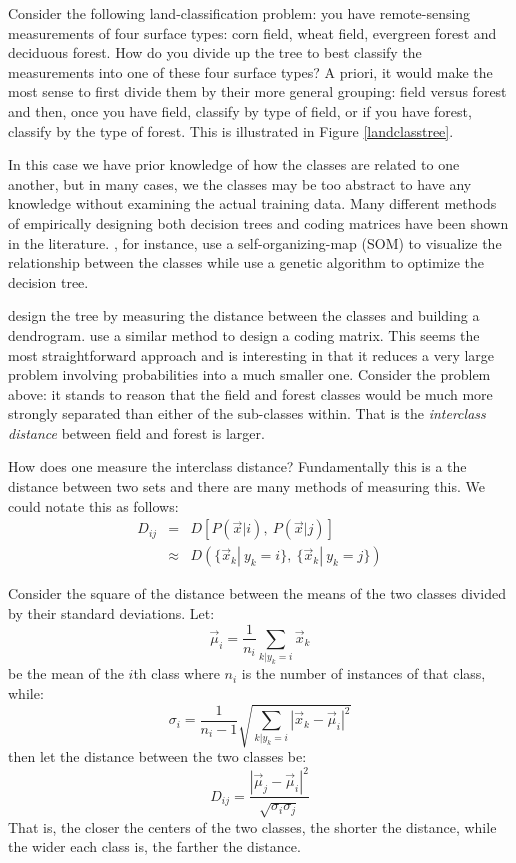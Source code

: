 \documentclass{article}
\begin{document}
Consider the following land-classification problem: you have remote-sensing measurements of four surface types: corn field, wheat field, evergreen forest and deciduous forest.
How do you divide up the tree to best classify the measurements into one of these four surface types?
A priori, it would make the most sense to first divide them by their more general grouping: field versus forest and then, once you have field, classify by type of field, or if you have forest, classify by the type of forest.
This is illustrated in Figure \ref{landclasstree}.

In this case we have prior knowledge of how the classes are related to one another,
but in many cases, we the classes may be too abstract to have any knowledge without examining the actual training data.
Many different methods of empirically designing both decision trees and coding matrices have been shown in the literature.
\citet{Cheong_etal2004}, for instance, use a self-organizing-map (SOM)
\cite{Kohonen2000} to visualize the relationship between the classes while
\citet{Lee_Oh2003} use a genetic algorithm to optimize the decision tree.

\citet{Benabdeslem_Bennani2006} design the tree by measuring the distance between
the classes and building a dendrogram.
\citet{Zhou_etal2008} use a similar method to design a coding matrix.
This seems the most straightforward approach and is interesting in that it reduces a very large problem involving probabilities into a much smaller one.
Consider the problem above: it stands to reason that the field and forest classes would be much more strongly separated than either of the sub-classes within.
That is the {\it interclass distance} between field and forest is larger.

How does one measure the interclass distance? Fundamentally this is a the distance between two sets and there are many methods of measuring this.
We could notate this as follows:
\begin{eqnarray}
	D_{ij} & = & D\left [P(\vec x|i),~P(\vec x|j)\right ] \\
	       & \approx & D\left (\lbrace \vec x_k|~y_k=i \rbrace,~\lbrace \vec x_k|~y_k=j\rbrace \right )
\end{eqnarray}

Consider the square of the distance between the means of the two classes divided by their standard deviations. Let:
\begin{equation}
	\vec \mu_i = \frac{1}{n_i} \sum_{k|y_k=i} \vec x_k
\end{equation}
be the mean of the $i$th class where $n_i$ is the number of instances of that class, while:
\begin{equation}
	\sigma_i = \frac{1}{n_i-1}\sqrt{\sum_{k|y_k=i}|\vec x_k - \vec \mu_i|^2}
\end{equation}
then let the distance between the two classes be:
\begin{equation}
	D_{ij}=\frac{|\vec \mu_j - \vec \mu_i |^2}{\sqrt{\sigma_i \sigma_j}}
\end{equation}
That is, the closer the centers of the two classes, the shorter the distance, while the wider each class is, the farther the distance.
	
\end{document}
